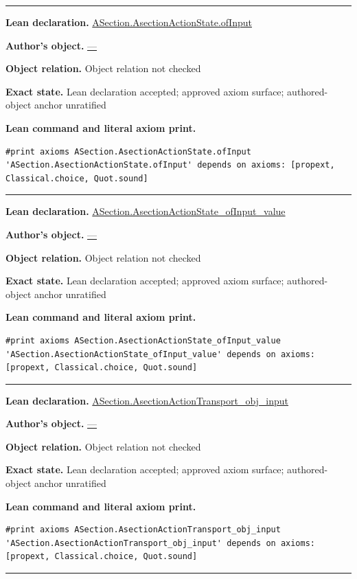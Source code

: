 \documentclass[11pt]{article}
\theoremstyle{plain}
\theoremstyle{definition}
\theoremstyle{remark}
\begin{document}
\begin{tcolorbox}
\begin{Verbatim}[breaklines=true,breakanywhere=true,fontsize=\small]
\end{Verbatim}
\medskip\hrule\medskip
\textbf{Lean declaration.} \url{ASection.AsectionActionState.ofInput}
\par\textbf{Author's object.} \url{—}
\par\textbf{Object relation.} Object relation not checked
\par\textbf{Exact state.} Lean declaration accepted; approved axiom surface; authored-object anchor unratified
\par\smallskip\textbf{Lean command and literal axiom print.}
\begin{Verbatim}[breaklines=true,breakanywhere=true,fontsize=\small]
#print axioms ASection.AsectionActionState.ofInput
'ASection.AsectionActionState.ofInput' depends on axioms: [propext, Classical.choice, Quot.sound]
\end{Verbatim}
\medskip\hrule\medskip
\textbf{Lean declaration.} \url{ASection.AsectionActionState_ofInput_value}
\par\textbf{Author's object.} \url{—}
\par\textbf{Object relation.} Object relation not checked
\par\textbf{Exact state.} Lean declaration accepted; approved axiom surface; authored-object anchor unratified
\par\smallskip\textbf{Lean command and literal axiom print.}
\begin{Verbatim}[breaklines=true,breakanywhere=true,fontsize=\small]
#print axioms ASection.AsectionActionState_ofInput_value
'ASection.AsectionActionState_ofInput_value' depends on axioms: [propext, Classical.choice, Quot.sound]
\end{Verbatim}
\medskip\hrule\medskip
\textbf{Lean declaration.} \url{ASection.AsectionActionTransport_obj_input}
\par\textbf{Author's object.} \url{—}
\par\textbf{Object relation.} Object relation not checked
\par\textbf{Exact state.} Lean declaration accepted; approved axiom surface; authored-object anchor unratified
\par\smallskip\textbf{Lean command and literal axiom print.}
\begin{Verbatim}[breaklines=true,breakanywhere=true,fontsize=\small]
#print axioms ASection.AsectionActionTransport_obj_input
'ASection.AsectionActionTransport_obj_input' depends on axioms: [propext, Classical.choice, Quot.sound]
\end{Verbatim}
\medskip\hrule\medskip

\end{tcolorbox}
\end{document}
